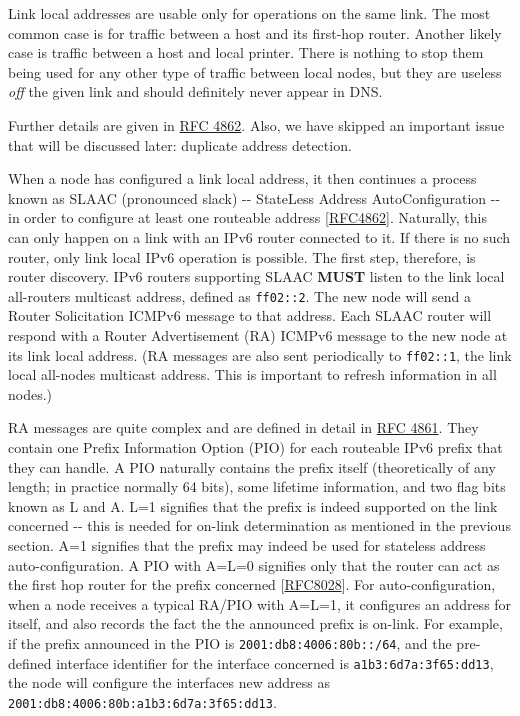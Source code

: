 \documentclass[
]{article}
\begin{document}
Link local addresses are usable only for operations on the same link.
The most common case is for traffic between a host and its first-hop
router. Another likely case is traffic between a host and local printer.
There is nothing to stop them being used for any other type of traffic
between local nodes, but they are useless \emph{off} the given link and
should definitely never appear in DNS.

Further details are given in
\href{https://www.rfc-editor.org/info/rfc4862}{RFC 4862}. Also, we have
skipped an important issue that will be discussed later: duplicate
address detection.

When a node has configured a link local address, it then continues a
process known as SLAAC (pronounced
\textquotesingle slack\textquotesingle) -\/- StateLess Address
AutoConfiguration -\/- in order to configure at least one routeable
address {[}\href{https://www.rfc-editor.org/info/rfc4862}{RFC4862}{]}.
Naturally, this can only happen on a link with an IPv6 router connected
to it. If there is no such router, only link local IPv6 operation is
possible. The first step, therefore, is router discovery. IPv6 routers
supporting SLAAC \textbf{MUST} listen to the link local all-routers
multicast address, defined as \texttt{ff02::2}. The new node will send a
Router Solicitation ICMPv6 message to that address. Each SLAAC router
will respond with a Router Advertisement (RA) ICMPv6 message to the new
node at its link local address. (RA messages are also sent periodically
to \texttt{ff02::1}, the link local all-nodes multicast address. This is
important to refresh information in all nodes.)

RA messages are quite complex and are defined in detail in
\href{https://www.rfc-editor.org/info/rfc4861}{RFC 4861}. They contain
one Prefix Information Option (PIO) for each routeable IPv6 prefix that
they can handle. A PIO naturally contains the prefix itself
(theoretically of any length; in practice normally 64 bits), some
lifetime information, and two flag bits known as L and A. L=1 signifies
that the prefix is indeed supported on the link concerned -\/- this is
needed for on-link determination as mentioned in the previous section.
A=1 signifies that the prefix may indeed be used for stateless address
auto-configuration. A PIO with A=L=0 signifies only that the router can
act as the first hop router for the prefix concerned
{[}\href{https://www.rfc-editor.org/info/rfc8028}{RFC8028}{]}. For
auto-configuration, when a node receives a typical RA/PIO with A=L=1, it
configures an address for itself, and also records the fact the the
announced prefix is on-link. For example, if the prefix announced in the
PIO is \texttt{2001:db8:4006:80b::/64}, and the pre-defined interface
identifier for the interface concerned is \texttt{a1b3:6d7a:3f65:dd13},
the node will configure the interface\textquotesingle s new address as
\texttt{2001:db8:4006:80b:a1b3:6d7a:3f65:dd13}.
\end{document}

